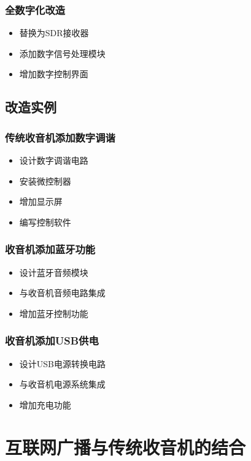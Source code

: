 \documentclass[12pt,UTF8]{ctexbook}
\begin{document}
\subsection{全数字化改造}\begin{itemize}
  \item 替换为SDR接收器
  \item 添加数字信号处理模块
  \item 增加数字控制界面\end{itemize}

\section{改造实例}

\subsection{传统收音机添加数字调谐}\begin{itemize}
  \item 设计数字调谐电路
  \item 安装微控制器
  \item 增加显示屏
  \item 编写控制软件\end{itemize}

\subsection{收音机添加蓝牙功能}\begin{itemize}
  \item 设计蓝牙音频模块
  \item 与收音机音频电路集成
  \item 增加蓝牙控制功能\end{itemize}

\subsection{收音机添加USB供电}\begin{itemize}
  \item 设计USB电源转换电路
  \item 与收音机电源系统集成
  \item 增加充电功能\end{itemize}

\chapter{互联网广播与传统收音机的结合}
\end{document}
